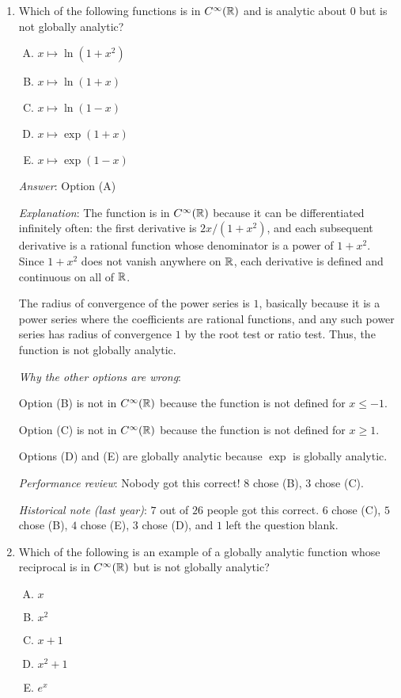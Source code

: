 \documentclass[10pt]{amsart}
\begin{document}
\begin{enumerate}
\item Which of the following functions is in $C^\infty(\mathbb{R})$ and is
  analytic about $0$ but is not globally analytic?
  \begin{enumerate}[(A)]
  \item $x \mapsto \ln(1 + x^2)$
  \item $x \mapsto \ln(1 + x)$
  \item $x \mapsto \ln(1 - x)$
  \item $x \mapsto \exp(1 + x)$
  \item $x \mapsto \exp(1 - x)$
  \end{enumerate}

  {\em Answer}: Option (A)

  {\em Explanation}: The function is in $C^\infty(\mathbb{R})$ because it can
  be differentiated infinitely often: the first derivative is $2x/(1 +
  x^2)$, and each subsequent derivative is a rational function whose
  denominator is a power of $1 + x^2$. Since $1 + x^2$ does not vanish
  anywhere on $\mathbb{R}$, each derivative is defined and continuous on all
  of $\mathbb{R}$.

  The radius of convergence of the power series is $1$, basically
  because it is a power series where the coefficients are rational
  functions, and any such power series has radius of convergence $1$
  by the root test or ratio test. Thus, the function is not globally
  analytic.

  {\em Why the other options are wrong}:

  Option (B) is not in $C^\infty(\mathbb{R})$ because the function is not
  defined for $x \le -1$.

  Option (C) is not in $C^\infty(\mathbb{R})$ because the function is not
  defined for $x \ge 1$.

  Options (D) and (E) are globally analytic because $\exp$ is globally
  analytic.

  {\em Performance review}: Nobody got this correct! $8$ chose (B),
  $3$ chose (C).

  {\em Historical note (last year)}: $7$ out of $26$ people got this
  correct. $6$ chose (C), $5$ chose (B), $4$ chose (E), $3$ chose (D),
  and $1$ left the question blank.

\item Which of the following is an example of a globally analytic
  function whose reciprocal is in $C^\infty(\mathbb{R})$ but is not globally
  analytic?

  \begin{enumerate}[(A)]
  \item $x$
  \item $x^2$
  \item $x + 1$
  \item $x^2 + 1$
  \item $e^x$
  \end{enumerate}


\end{enumerate}
\end{document}
